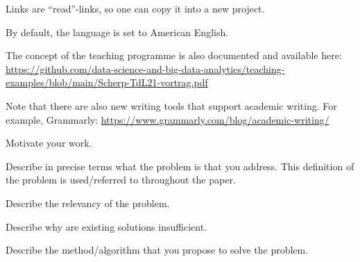 \documentclass[sigconf, review, nonacm]{acmart}
\begin{document}
Links are ``read''-links, so one can copy it into a new project.

By default, the language is set to American English.

The concept of the teaching programme is also documented and available here:
\url{https://github.com/data-science-and-big-data-analytics/teaching-examples/blob/main/Scherp-TdL21-vortrag.pdf}

Note that there are also new writing tools that support academic writing. 
For example, Grammarly: \url{https://www.grammarly.com/blog/academic-writing/}

\label{sec:introduction}




Motivate your work.



Describe in precise terms what the problem is that you address. 
This definition of the problem is used/referred to throughout the paper.


Describe the relevancy of the problem. 


Describe why are existing solutions insufficient.



Describe the method/algorithm that you propose to solve the problem.

\end{document}

